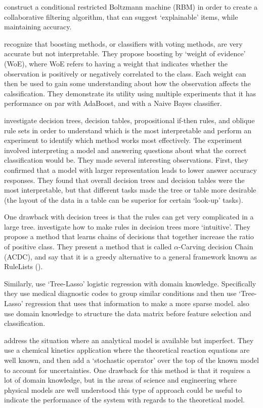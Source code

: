    \cite{Abdollahi2016-vn} construct a conditional restricted Boltzmann machine (RBM) in order to create a collaborative filtering algorithm, that can suggest `explainable' items, while maintaining accuracy. 

    \cite{Ridgeway1998-lv} recognize that boosting methods, or classifiers with voting methods, are very accurate but not interpretable. They propose boosting by `weight of evidence' (WoE), where WoE refers to having a weight that indicates whether the observation is positively or negatively correlated to the class. Each weight can then be used to gain some understanding about how the observation affects the calssification. They demonstrate its utility using multiple experiments that it has performance on par with AdaBoost, and with a Naive Bayes classifier. 

    \citet{Huysmans2011-th} investigate decision trees, decision tables, propositional if-then rules, and oblique rule sets in order to understand which is the most interpretable and perform an experiment to identify which method works most effectively. The experiment involved interpreting a model and answering questions about what the correct classification would be. They made several interesting observations. First, they confirmed that a model with larger representation leads to lower answer accuracy responses. They found that overall decision trees and decision tables were the most interpretable, but that different tasks made the tree or table more desirable (the layout of the data in a table can be superior for certain `look-up' tasks).

    One drawback with decision trees is that the rules can get very complicated in a large tree. \citet{Park2016-ld} investigate how to make rules in decision trees more `intuitive'. They propose a method that learns chains of decisions that together increase the ratio of positive class. They present a method that is called $\alpha$-Carving decision Chain (ACDC), and say that it is a greedy alternative to a general framework known as RuleLists (\citet{Wang2015-ww}). 


    Similarly, \citet{Jovanovic2016-gw} use `Tree-Lasso' logistic regression with domain knowledge. Specifically they use medical diagnostic codes to group similar conditions and then use `Tree-Lasso' regression that uses that information to make a more sparse model. \citet{Zycinski2012-jj} also use domain knowledge to structure the data matrix before feature selection and classification. 

    \cite{Morrison2016-fz} address the situation where an analytical model is available but imperfect. They use a chemical kinetics application where the theoretical reaction equations are well known, and then add a `stochastic operator' over the top of the known model to account for uncertainties. One drawback for this method is that it requires a lot of domain knowledge, but in the areas of science and engineering where physical models are well understood this type of approach could be useful to indicate the performance of the system with regards to the theoretical model.

